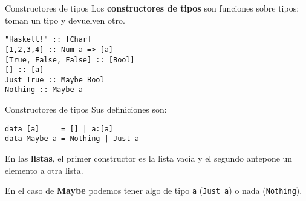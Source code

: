 \begin{frame}[fragile]{Constructores de tipos}
  Los \textbf{constructores de tipos} son funciones sobre tipos:
   toman un tipo y devuelven otro.

  \espacio

  \begin{lstlisting}
"Haskell!" :: [Char]
[1,2,3,4] :: Num a => [a]
[True, False, False] :: [Bool]
[] :: [a]
Just True :: Maybe Bool
Nothing :: Maybe a
  \end{lstlisting}

\end{frame}

\begin{frame}[fragile]{Constructores de tipos}
  Sus definiciones son:

  \espacio

  \begin{lstlisting}
data [a]     = [] | a:[a]
data Maybe a = Nothing | Just a
  \end{lstlisting}

  \espacio

  En las \textbf{listas}, el primer constructor es la lista vacía y
  el segundo antepone un elemento a otra lista.

  \espacio

  En el caso de \textbf{Maybe} podemos tener algo de tipo \texttt{a} (\texttt{Just a})
  o nada (\texttt{Nothing}).

\end{frame}
